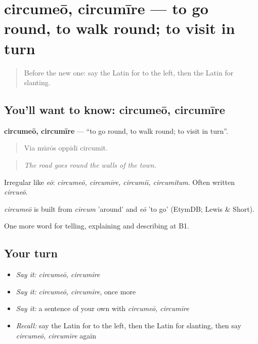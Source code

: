 \section[circumeō, circumīre]{circumeō, circumīre — to go round, to walk round; to visit in turn}

\label{lesson:LA-C454-circumeo}



\begin{quote}
Before the new one: say the Latin for to the left, then the Latin for slanting.
\end{quote}

\subsection*{You'll want to know: circumeō, circumīre}
\textbf{circumeō, circumīre} — \textquotedblleft{}to go round, to walk round; to visit in turn\textquotedblright{}.

\begin{quote}
Via mūrōs oppidī circumit.
\end{quote}

\begin{quote}
\emph{The road goes round the walls of the town.}
\end{quote}

Irregular like \emph{eō}: \emph{circumeō, circumīre, circumiī, circumitum}. Often written \emph{circueō}.

\begin{cousinweb}
\emph{circumeō} is built from \emph{circum} 'around' and \emph{eō} 'to go' (EtymDB; Lewis \& Short).
\end{cousinweb}

\begin{grammarlens}[title={What you've built}]
One more word for telling, explaining and describing at B1.
\end{grammarlens}

\subsection*{Your turn}
\begin{itemize}
\raggedright
  \item \emph{Say it:} \emph{circumeō, circumīre}
  \item \emph{Say it:} \emph{circumeō, circumīre}, once more
  \item \emph{Say it:} a sentence of your own with \emph{circumeō, circumīre}
  \item \emph{Recall:} say the Latin for to the left, then the Latin for slanting, then say \emph{circumeō, circumīre} again
\end{itemize}

